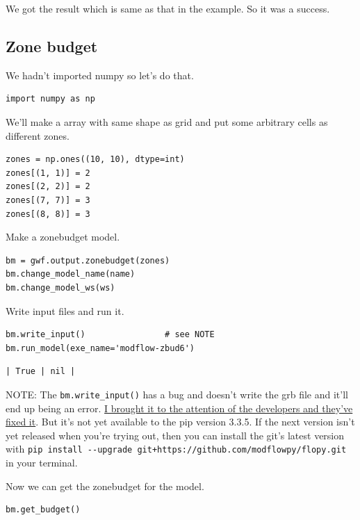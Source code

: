 \documentclass[titlepage,12pt]{unisubmission}
\begin{document}
We got the result which is same as that in the example. So it was a success.

\subsection{Zone budget}
\label{sec:org7d77eac}
We hadn't imported numpy so let's do that.

\begin{verbatim}
import numpy as np
\end{verbatim}

We'll make a array with same shape as grid and put some arbitrary cells as different zones.

\begin{verbatim}
zones = np.ones((10, 10), dtype=int)
zones[(1, 1)] = 2
zones[(2, 2)] = 2
zones[(7, 7)] = 3
zones[(8, 8)] = 3
\end{verbatim}

Make a zonebudget model.

\begin{verbatim}
bm = gwf.output.zonebudget(zones)
bm.change_model_name(name)
bm.change_model_ws(ws)
\end{verbatim}

Write input files and run it.

\begin{verbatim}
bm.write_input()                # see NOTE
bm.run_model(exe_name='modflow-zbud6')
\end{verbatim}

\begin{verbatim}
| True | nil |
\end{verbatim}

NOTE: The \texttt{bm.write\_input()} has a bug and doesn't write the grb file and it'll end up being an error. \href{https://github.com/modflowpy/flopy/issues/1395}{I brought it to the attention of the developers and they've fixed it}. But it's not yet available to the pip version 3.3.5. If the next version isn't yet released when you're trying out, then you can install the git's latest version with \texttt{pip install -{}-upgrade git+https://github.com/modflowpy/flopy.git} in your terminal.

Now we can get the zonebudget for the model.

\begin{verbatim}
bm.get_budget()
\end{verbatim}
\end{document}
